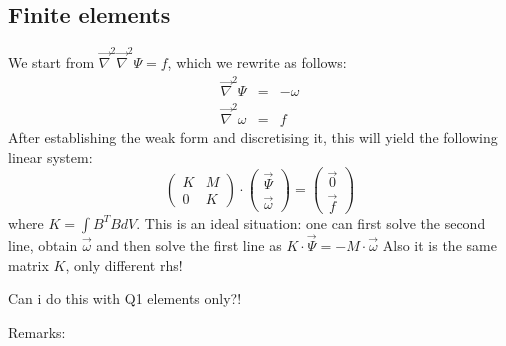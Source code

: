 \subsection{Finite elements}

We start from $\vec\nabla^2 \vec\nabla^2 \Psi = f$, which we rewrite as follows:
\begin{eqnarray}
\vec\nabla^2 \Psi &=& -\omega \\
\vec\nabla^2 \omega &=& f
\end{eqnarray}
After establishing the weak form and discretising it, this will yield the following linear system:
\[
\left(
\begin{array}{cc}
K & M \\
0 & K
\end{array}
\right)
\cdot
\left(
\begin{array}{cc}
\vec\Psi\\
\vec\omega
\end{array}
\right)
=
\left(
\begin{array}{cc}
\vec 0\\
\vec f
\end{array}
\right)
\]
where $K=\int B^T B dV$. 
This is an ideal situation: one can first solve the second line, obtain $\vec\omega$
and then solve the first line as $K \cdot \vec \Psi = - M \cdot \vec\omega$
Also it is the same matrix $K$, only different rhs!

{\color{teal} Can i do this with Q1 elements only?!}

Remarks:

